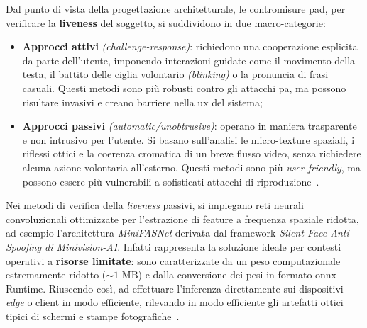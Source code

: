 Dal punto di vista della progettazione architetturale, le contromisure \gls{pad}, per verificare la \textbf{liveness} del soggetto, si suddividono in due macro-categorie:
\begin{itemize}
    \item \textbf{Approcci attivi} \textit{(challenge-response)}: richiedono una cooperazione esplicita da parte dell'utente, imponendo interazioni guidate come il movimento della testa, il battito delle ciglia volontario \textit{(blinking)} o la pronuncia di frasi casuali. Questi metodi sono più robusti contro gli attacchi \gls{pa}, ma possono risultare invasivi e creano barriere nella \gls{ux} del sistema;
    \item \textbf{Approcci passivi} \textit{(automatic/unobtrusive)}: operano in maniera trasparente e non intrusivo per l'utente. Si basano sull'analisi le micro-texture spaziali, i riflessi ottici e la coerenza cromatica di un breve flusso video, senza richiedere alcuna azione volontaria all'esterno. Questi metodi sono più \textit{user-friendly}, ma possono essere più vulnerabili a sofisticati attacchi di riproduzione~\cite{liSilentFaceAntiSpoofing2024}.
\end{itemize}
Nei metodi di verifica della \textit{liveness} passivi, si impiegano reti neurali convoluzionali ottimizzate per l'estrazione di feature a frequenza spaziale ridotta, ad esempio l'architettura \textit{MiniFASNet} derivata dal framework \textit{Silent-Face-Anti-Spoofing di Minivision-AI}. Infatti rappresenta la soluzione ideale per contesti operativi a \textbf{risorse limitate}: sono caratterizzate da un peso computazionale estremamente ridotto ($\sim 1\text{ MB}$) e dalla conversione dei pesi in formato \gls{onnx} Runtime. Riuscendo così, ad effettuare l'inferenza direttamente sui dispositivi \textit{edge} o client in modo efficiente, rilevando in modo efficiente gli artefatti ottici tipici di schermi e stampe fotografiche~\cite{liSilentFaceAntiSpoofing2024}.

